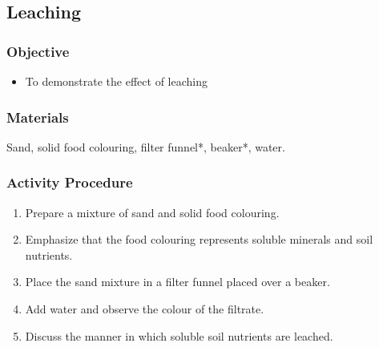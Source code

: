 \subsection{Leaching}

\subsubsection{Objective}
\begin{itemize}
\item{To demonstrate the effect of leaching}
\end{itemize}

\subsubsection{Materials}
Sand, solid food colouring, filter funnel*, beaker*, water.

\subsubsection{Activity Procedure}
\begin{enumerate}
\item{Prepare a mixture of sand and solid food colouring.}
\item{Emphasize that the food colouring represents soluble minerals and soil nutrients.}
\item{Place the sand mixture in a filter funnel placed over a beaker.}
\item{Add water and observe the colour of the filtrate.}
\item{Discuss the manner in which soluble soil nutrients are leached.}
\end{enumerate}
